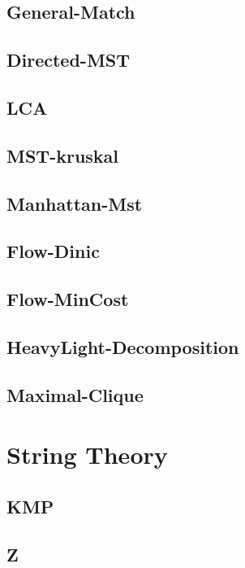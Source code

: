 \documentclass[a4paper,10pt,twocolumn,oneside]{article}
\begin{document}
\subsection{General-Match}

\subsection{Directed-MST}

\subsection{LCA}

\subsection{MST-kruskal}

\subsection{Manhattan-Mst}

\subsection{Flow-Dinic}

\subsection{Flow-MinCost}

\subsection{HeavyLight-Decomposition}

\subsection{Maximal-Clique}


\section{String Theory}
\subsection{KMP}

\subsection{Z}

\end{document}
